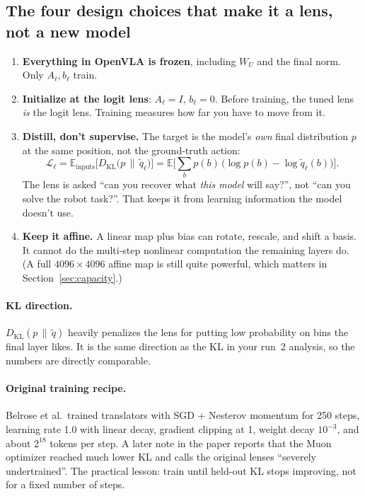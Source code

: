 \documentclass[11pt]{article}
\newcommand{\KL}{D_{\mathrm{KL}}}
\begin{document}
\subsection{The four design choices that make it a lens, not a new model}
\begin{enumerate}
  \item \textbf{Everything in OpenVLA is frozen}, including $W_U$ and the final norm. Only $A_\ell, b_\ell$ train.
  \item \textbf{Initialize at the logit lens}: $A_\ell = I$, $b_\ell = 0$. Before training, the tuned lens \emph{is} the logit lens. Training measures how far you have to move from it.
  \item \textbf{Distill, don't supervise.} The target is the model's \emph{own} final distribution $p$ at the same position, not the ground-truth action:
  \begin{equation}
  \mathcal{L}_\ell = \mathbb{E}_{\text{inputs}}\Big[\KL\big(p \,\|\, \tilde q_\ell\big)\Big] = \mathbb{E}\Big[\textstyle\sum_{b} p(b)\,\big(\log p(b) - \log \tilde q_\ell(b)\big)\Big].
  \end{equation}
  The lens is asked ``can you recover what \emph{this model} will say?'', not ``can you solve the robot task?''. That keeps it from learning information the model doesn't use.
  \item \textbf{Keep it affine.} A linear map plus bias can rotate, rescale, and shift a basis. It cannot do the multi-step nonlinear computation the remaining layers do. (A full $4096\times4096$ affine map is still quite powerful, which matters in Section~\ref{sec:capacity}.)
\end{enumerate}

\paragraph{KL direction.} $\KL(p\,\|\,\tilde q)$ heavily penalizes the lens for putting low probability on bins the final layer likes. It is the same direction as the KL in your run~2 analysis, so the numbers are directly comparable.

\paragraph{Original training recipe.} Belrose et al.\ trained translators with SGD + Nesterov momentum for 250 steps, learning rate 1.0 with linear decay, gradient clipping at 1, weight decay $10^{-3}$, and about $2^{18}$ tokens per step. A later note in the paper reports that the Muon optimizer reached much lower KL and calls the original lenses ``severely undertrained''. The practical lesson: train until held-out KL stops improving, not for a fixed number of steps.
\end{document}
